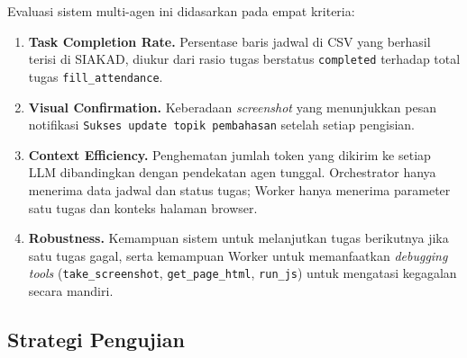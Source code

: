 Evaluasi sistem multi-agen ini didasarkan pada empat kriteria:
\begin{enumerate}
  \item \textbf{Task Completion Rate.} Persentase baris jadwal di CSV yang berhasil terisi di SIAKAD, diukur dari rasio tugas berstatus \texttt{completed} terhadap total tugas \texttt{fill\_attendance}.
  \item \textbf{Visual Confirmation.} Keberadaan \textit{screenshot} yang menunjukkan pesan notifikasi \texttt{Sukses update topik pembahasan} setelah setiap pengisian.
  \item \textbf{Context Efficiency.} Penghematan jumlah token yang dikirim ke setiap LLM dibandingkan dengan pendekatan agen tunggal. Orchestrator hanya menerima data jadwal dan status tugas; Worker hanya menerima parameter satu tugas dan konteks halaman browser.
  \item \textbf{Robustness.} Kemampuan sistem untuk melanjutkan tugas berikutnya jika satu tugas gagal, serta kemampuan Worker untuk memanfaatkan \textit{debugging tools} (\texttt{take\_screenshot}, \texttt{get\_page\_html}, \texttt{run\_js}) untuk mengatasi kegagalan secara mandiri.
\end{enumerate}

\subsection{Strategi Pengujian}

